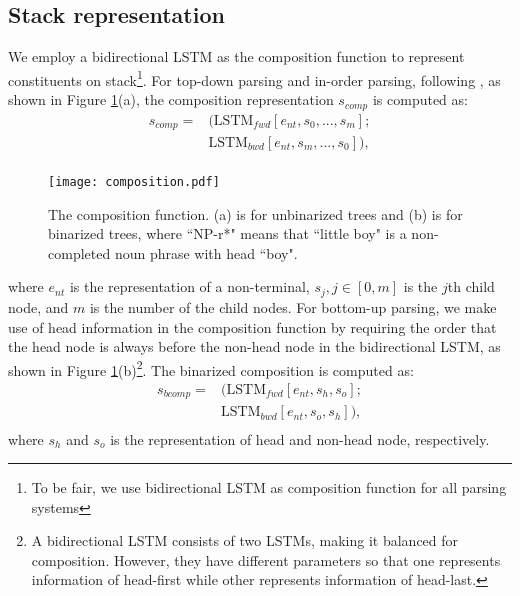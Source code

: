 \documentclass[11pt,letterpaper]{article}
\begin{document}
\subsection{Stack representation}
We employ a bidirectional LSTM as the composition function to represent constituents on stack\footnote{To be fair, we use bidirectional LSTM as composition function for all parsing systems}.
For top-down parsing and in-order parsing, following , as shown in Figure \ref{composition}(a), the composition representation $s_{comp}$ is computed as:
\begin{equation*}
\begin{array}{cl}
s_{comp} = & (\text{LSTM}_{fwd}[e_{nt}, s_{0}, ..., s_{m}]; \\
&\text{LSTM}_{bwd}[e_{nt}, s_{m}, ..., s_{0}] ), \\
\end{array}
\end{equation*}
\begin{figure}
\begin{center}
\texttt{[image: composition.pdf]}
\end{center}
\caption{\label{composition} The composition function. (a) is for unbinarized trees and (b) is for binarized trees, where ``NP-r*" means that ``little boy" is a non-completed noun phrase with head ``boy".}
\end{figure}
where $e_{nt}$ is the representation of a non-terminal, $s_{j}, j\in[0,m]$ is the $j$th child node, and $m$ is the number of the child nodes. 
For bottom-up parsing, we make use of head information in the composition function by requiring the order that the head node is always before the non-head node in the bidirectional LSTM, as shown in Figure \ref{composition}(b)\footnote{A bidirectional LSTM consists of two LSTMs, making it balanced for composition. However, they have different parameters so that one represents information of head-first while other represents information of head-last.}.
The binarized composition is computed as:
\begin{equation*}
\begin{array}{cl}
s_{bcomp} = & (\text{LSTM}_{fwd}[e_{nt}, s_{h}, s_{o}]; \\
&\text{LSTM}_{bwd}[e_{nt}, s_{o}, s_{h}] ), \\
\end{array}
\end{equation*}
where $s_{h}$ and $s_{o}$ is the representation of head and non-head node, respectively. 
\end{document}
